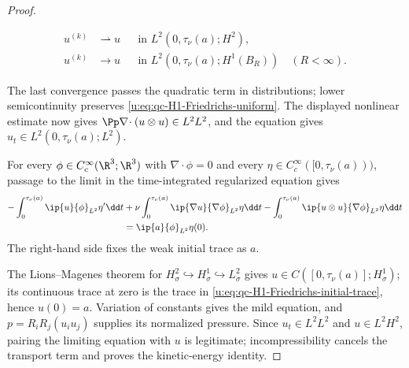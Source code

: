 \begin{proof}
\begin{samepage}
\begin{align*}
 u^{(k)}&\rightharpoonup u
 &&\text{in }L^2(0,\tau_\nu(a);H^2),\\
 u^{(k)}&\longrightarrow u
 &&\text{in }L^2(0,\tau_\nu(a);H^1(B_R))
 \quad(R<\infty).
\end{align*}
\par
\end{samepage}
The last convergence passes the quadratic term in distributions; lower
semicontinuity preserves \eqref{u:eq:qc-H1-Friedrichs-uniform}.  The displayed
nonlinear estimate now gives
\(\Pp\nabla\!\cdot(u\otimes u)\in L^2L^2\), and the equation gives
\(u_t\in L^2(0,\tau_\nu(a);L^2)\).
\begin{samepage}
For every
\(\phi\in C_c^\infty(\R^3;\R^3)\) with \(\nabla\cdot\phi=0\) and every
\(\eta\in C_c^\infty([0,\tau_\nu(a)))\), passage to the limit in the
time-integrated regularized equation gives
\begin{align}
 -\int_0^{\tau_\nu(a)}\ip{u}{\phi}_{L^2}\eta'\dd t
 &+\nu\int_0^{\tau_\nu(a)}\ip{\nabla u}{\nabla\phi}_{L^2}\eta\dd t
 -\int_0^{\tau_\nu(a)}\ip{u\otimes u}{\nabla\phi}_{L^2}\eta\dd t
 \notag\\
 &=\ip{a}{\phi}_{L^2}\eta(0).
 \label{u:eq:qc-H1-Friedrichs-initial-trace}
\end{align}
The right-hand side fixes the weak initial trace as \(a\).
\par
\end{samepage}
The Lions--Magenes theorem \cite{LionsMagenes1972} for
\(H^2_\sigma\hookrightarrow H^1_\sigma\hookrightarrow L^2_\sigma\)
gives \(u\in C([0,\tau_\nu(a)];H^1_\sigma)\); its continuous trace at zero is
the trace in \eqref{u:eq:qc-H1-Friedrichs-initial-trace}, hence \(u(0)=a\).
Variation of constants gives the mild equation, and
\(p=R_iR_j(u_i u_j)\) supplies its normalized pressure.  Since
\(u_t\in L^2L^2\) and \(u\in L^2H^2\), pairing the limiting equation with
\(u\) is legitimate; incompressibility cancels the transport term and proves
the kinetic-energy identity.


\end{proof}

